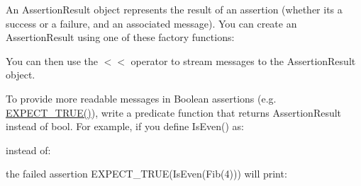 An {\ttfamily Assertion\+Result} object represents the result of an assertion (whether it\textquotesingle{}s a success or a failure, and an associated message). You can create an {\ttfamily Assertion\+Result} using one of these factory functions\+:


\begin{DoxyCode}{0}
\DoxyCodeLine{}
\DoxyCodeLine{}
\DoxyCodeLine{}
\DoxyCodeLine{\}}
\end{DoxyCode}


You can then use the {\ttfamily $<$$<$} operator to stream messages to the {\ttfamily Assertion\+Result} object.

To provide more readable messages in Boolean assertions (e.\+g. {\ttfamily \mbox{\hyperlink{googletest-master_2googletest_2include_2gtest_2gtest_8h_ac33e7cdfb5d44a7a0f0ab552eb5c3c6a}{E\+X\+P\+E\+C\+T\+\_\+\+T\+R\+U\+E()}}}), write a predicate function that returns {\ttfamily Assertion\+Result} instead of {\ttfamily bool}. For example, if you define {\ttfamily Is\+Even()} as\+:


\begin{DoxyCode}{0}
\DoxyCodeLine{\}}
\end{DoxyCode}


instead of\+:


\begin{DoxyCode}{0}
\DoxyCodeLine{\}}
\end{DoxyCode}


the failed assertion {\ttfamily E\+X\+P\+E\+C\+T\+\_\+\+T\+R\+UE(Is\+Even(\+Fib(4)))} will print\+:


\begin{DoxyCode}{0}
\end{DoxyCode}



